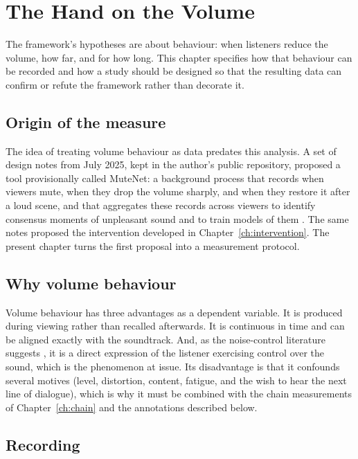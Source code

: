\chapter{The Hand on the Volume}
\label{ch:response}

The framework's hypotheses are about behaviour: when listeners reduce the volume, how far, and for how long. This chapter specifies how that behaviour can be recorded and how a study should be designed so that the resulting data can confirm or refute the framework rather than decorate it.

\section{Origin of the measure}

The idea of treating volume behaviour as data predates this analysis. A set of design notes from July 2025, kept in the author's public repository, proposed a tool provisionally called MuteNet: a background process that records when viewers mute, when they drop the volume sharply, and when they restore it after a loud scene, and that aggregates these records across viewers to identify consensus moments of unpleasant sound and to train models of them \citep{flyxion2025}. The same notes proposed the intervention developed in Chapter~\ref{ch:intervention}. The present chapter turns the first proposal into a measurement protocol.

\section{Why volume behaviour}

Volume behaviour has three advantages as a dependent variable. It is produced during viewing rather than recalled afterwards. It is continuous in time and can be aligned exactly with the soundtrack. And, as the noise-control literature suggests \citep{glass1972}, it is a direct expression of the listener exercising control over the sound, which is the phenomenon at issue. Its disadvantage is that it confounds several motives (level, distortion, content, fatigue, and the wish to hear the next line of dialogue), which is why it must be combined with the chain measurements of Chapter~\ref{ch:chain} and the annotations described below.

\section{Recording}

